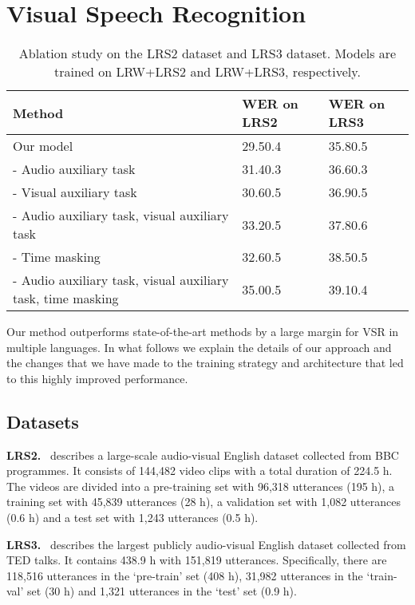 \documentclass[twocolumn]{article}
\begin{document}
\section{Visual Speech Recognition}
\begin{table*}[!t]
\centering
\caption{Ablation study on the LRS2 dataset and LRS3 dataset. Models are trained on LRW+LRS2 and LRW+LRS3, respectively.}
\renewcommand\arraystretch{1.1}
\begin{tabularx}{\textwidth}{u y y}
\toprule
Method &WER on LRS2 &WER on LRS3 \\
\midrule\midrule
Our model  &29.50.4 &35.80.5 \\
\midrule
- Audio auxiliary task  &31.40.3 &36.60.3 \\
\midrule
- Visual auxiliary task &30.60.5 &36.90.5 \\
\midrule
- Audio auxiliary task, visual auxiliary task & 33.20.5 &37.80.6 \\
\midrule
- Time masking & 32.60.5 &38.50.5 \\
\midrule
- Audio auxiliary task, visual auxiliary task, time masking & 35.00.5 &39.10.4 \\
\bottomrule
\end{tabularx}
\label{tab: ablation_study_on_lrs2_and_lrs3}
\end{table*} Our method outperforms state-of-the-art methods by a large margin for VSR in multiple languages. In what follows we explain the details of our approach and the changes that we have made to the training strategy and architecture that led to this highly improved performance.

\subsection{Datasets}
\textbf{LRS2.}~\cite{chung2017lip} describes a large-scale audio-visual English dataset collected from BBC programmes. It consists of 144,482 video clips with a total duration of 224.5 h. The videos are divided into a pre-training set with 96,318 utterances (195 h), a training set with 45,839 utterances (28 h), a validation set with 1,082 utterances (0.6 h) and a test set with 1,243 utterances (0.5 h).

\noindent\textbf{LRS3.}~\cite{afouras2018lrs3} describes the largest publicly audio-visual English dataset collected from TED talks. It contains 438.9 h with 151,819 utterances. Specifically, there are 118,516 utterances in the ‘pre-train’ set (408 h), 31,982 utterances in the ‘train-val’ set (30 h) and 1,321 utterances in the ‘test’ set (0.9 h).
\end{document}
